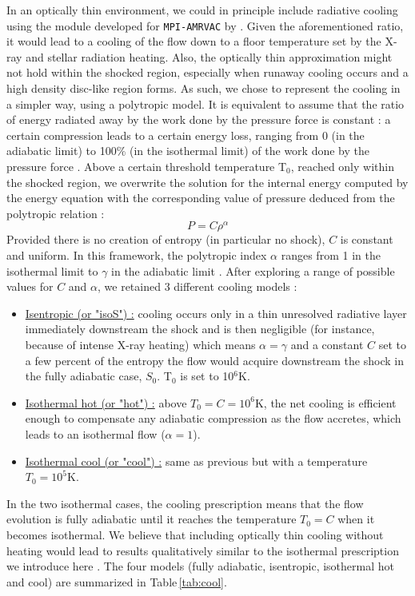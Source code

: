 \documentclass{aa}
\begin{document}
In an optically thin environment, we could in principle include radiative cooling using the module developed for \texttt{MPI-AMRVAC} by \cite{VanMarle2011}. Given the aforementioned ratio, it would lead to a cooling of the flow down to a floor temperature set by the X-ray and stellar radiation heating. Also, the optically thin approximation might not hold within the shocked region, especially when runaway cooling occurs and a high density disc-like region forms. As such, we chose to represent the cooling in a simpler way, using a polytropic model. It is equivalent to assume that the ratio of energy radiated away by the work done by the pressure force is constant : a certain compression leads to a certain energy loss, ranging from 0 (in the adiabatic limit) to 100\% (in the isothermal limit) of the work done by the pressure force \citep{Christians2012}. Above a certain threshold temperature T$_{0}$, reached only within the shocked region, we overwrite the solution for the internal energy computed by the energy equation with the corresponding value of pressure deduced from the polytropic relation :
\begin{equation}
P=C\rho^{\alpha}
\end{equation}
Provided there is no creation of entropy (in particular no shock), $C$ is constant and uniform. In this framework, the polytropic index $\alpha$ ranges from 1 in the isothermal limit to $\gamma$ in the adiabatic limit \citep{Horedt2000}. After exploring a range of possible values for $C$ and $\alpha$, we retained 3 different cooling models :
\begin{itemize}
\item \underline{Isentropic (or "isoS") :} cooling occurs only in a thin unresolved radiative layer immediately downstream the shock and is then negligible (for instance, because of intense X-ray heating) which means $\alpha=\gamma$ and a constant $C$ set to a few percent of the entropy the flow would acquire downstream the shock in the fully adiabatic case, $S_0$. T$_{0}$ is set to 10$^6$K.
\item \underline{Isothermal hot (or "hot") :} above $T_0=C=10^6$K, the net cooling is efficient enough to compensate any adiabatic compression as the flow accretes, which leads to an isothermal flow ($\alpha=1$).
\item \underline{Isothermal cool (or "cool") :} same as previous but with a temperature $T_0=10^5$K.
\end{itemize}
In the two isothermal cases, the cooling prescription means that the flow evolution is fully adiabatic until it reaches the temperature $T_0=C$ when it becomes isothermal. We believe that including optically thin cooling without heating would lead to results qualitatively similar to the isothermal prescription we introduce here \citep[as noticed by][]{Saladino2018} . The four models (fully adiabatic, isentropic, isothermal hot and cool) are summarized in Table\,\ref{tab:cool}.
\end{document}
